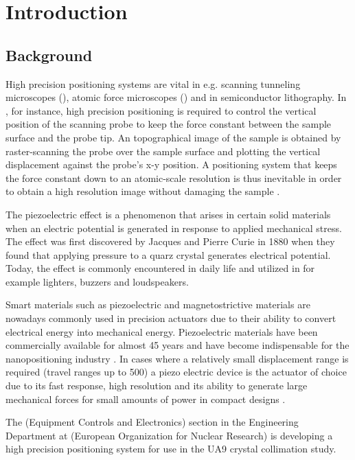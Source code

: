 \chapter{Introduction}\label{cha:intro}

\section{Background}
High precision positioning systems are vital in e.g. scanning tunneling microscopes (\abbrSTM), atomic force microscopes (\abbrAFM) and in semiconductor lithography. In \abbrAFM, for instance, high precision positioning is required to control the vertical position of the scanning probe to keep the force constant between the sample surface and the probe tip. An topographical image of the sample is obtained by raster-scanning the probe over the sample surface and plotting the vertical displacement against the probe's x-y position. A positioning system that keeps the force constant down to an atomic-scale resolution is thus inevitable in order to obtain a high resolution image without damaging the sample \citep{SurveyOfControlIssues:2007}.

The piezoelectric effect is a phenomenon that arises in certain solid materials when an electric potential is generated in response to applied mechanical stress. The effect was first discovered by Jacques and Pierre Curie in 1880 when they found that applying pressure to a quarz crystal generates electrical potential. Today, the effect is commonly encountered in daily life and utilized in for example lighters, buzzers and loudspeakers.

Smart materials such as piezoelectric and magnetostrictive materials are nowadays commonly used in precision actuators due to their ability to convert electrical energy into mechanical energy. Piezoelectric materials have been commercially available for almost 45 years and have become indispensable for the nanopositioning industry \citep{Piezo:2008}. In cases where a relatively small displacement range is required (travel ranges up to \unit{500}{\micro\meter}) a piezo electric device is the actuator of choice due to its fast response, high resolution and its ability to generate large mechanical forces for small amounts of power in compact designs \citep{SurveyOfControlIssues:2007}.

The \abbrECE (Equipment Controls and Electronics) section in the Engineering Department at \abbrCERN (European Organization for Nuclear Research) is developing a high precision positioning system for use in the UA9 crystal collimation study.

